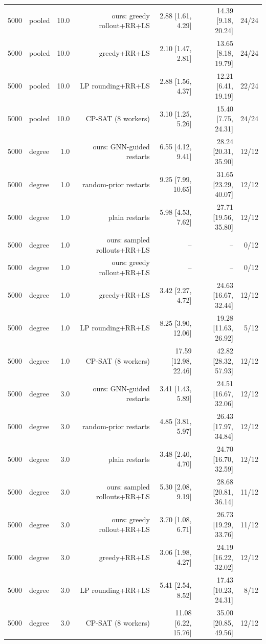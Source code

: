 \begin{table}[t]
\begin{tabular}{llrrrrr}
5000 & pooled & 10.0 & ours: greedy rollout+RR+LS & 2.88 [1.61, 4.29] & 14.39 [9.18, 20.24] & 24/24 \\
5000 & pooled & 10.0 & greedy+RR+LS & 2.10 [1.47, 2.81] & 13.65 [8.18, 19.79] & 24/24 \\
5000 & pooled & 10.0 & LP rounding+RR+LS & 2.88 [1.56, 4.37] & 12.21 [6.41, 19.19] & 22/24 \\
5000 & pooled & 10.0 & CP-SAT (8 workers) & 3.10 [1.25, 5.26] & 15.40 [7.75, 24.31] & 24/24 \\
5000 & degree & 1.0 & ours: GNN-guided restarts & 6.55 [4.12, 9.41] & 28.24 [20.31, 35.90] & 12/12 \\
5000 & degree & 1.0 & random-prior restarts & 9.25 [7.99, 10.65] & 31.65 [23.29, 40.07] & 12/12 \\
5000 & degree & 1.0 & plain restarts & 5.98 [4.53, 7.62] & 27.71 [19.56, 35.80] & 12/12 \\
5000 & degree & 1.0 & ours: sampled rollouts+RR+LS & -- & -- & 0/12 \\
5000 & degree & 1.0 & ours: greedy rollout+RR+LS & -- & -- & 0/12 \\
5000 & degree & 1.0 & greedy+RR+LS & 3.42 [2.27, 4.72] & 24.63 [16.67, 32.44] & 12/12 \\
5000 & degree & 1.0 & LP rounding+RR+LS & 8.25 [3.90, 12.06] & 19.28 [11.63, 26.92] & 5/12 \\
5000 & degree & 1.0 & CP-SAT (8 workers) & 17.59 [12.98, 22.46] & 42.82 [28.32, 57.93] & 12/12 \\
5000 & degree & 3.0 & ours: GNN-guided restarts & 3.41 [1.43, 5.89] & 24.51 [16.67, 32.06] & 12/12 \\
5000 & degree & 3.0 & random-prior restarts & 4.85 [3.81, 5.97] & 26.43 [17.97, 34.84] & 12/12 \\
5000 & degree & 3.0 & plain restarts & 3.48 [2.40, 4.70] & 24.70 [16.70, 32.59] & 12/12 \\
5000 & degree & 3.0 & ours: sampled rollouts+RR+LS & 5.30 [2.08, 9.19] & 28.68 [20.81, 36.14] & 11/12 \\
5000 & degree & 3.0 & ours: greedy rollout+RR+LS & 3.70 [1.08, 6.71] & 26.73 [19.29, 33.76] & 11/12 \\
5000 & degree & 3.0 & greedy+RR+LS & 3.06 [1.98, 4.27] & 24.19 [16.22, 32.02] & 12/12 \\
5000 & degree & 3.0 & LP rounding+RR+LS & 5.41 [2.54, 8.52] & 17.43 [10.23, 24.31] & 8/12 \\
5000 & degree & 3.0 & CP-SAT (8 workers) & 11.08 [6.22, 15.76] & 35.00 [20.85, 49.56] & 12/12 \\

\end{tabular}
\end{table}

